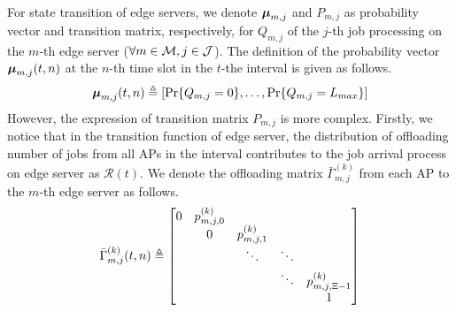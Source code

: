 {    %
    For state transition of edge servers, we denote $\boldsymbol{\mu}_{m,j}$ and $P_{m,j}$ as probability vector and transition matrix, respectively, for $Q_{m,j}$ of the $j$-th job processing on the $m$-th edge server ($\forall m\in\mathcal{M}, j\in\mathcal{J}$). The definition of the probability vector $\boldsymbol{\mu}_{m,j}(t,n)$ at the $n$-th time slot in the $t$-the interval is given as follows.
    \begin{align}
        \boldsymbol{\mu}_{m,j}(t,n) \triangleq [\Pr\{Q_{m,j}=0\}, \dots, \Pr\{Q_{m,j}=L_{max}\}]
    \end{align}
    However, the expression of transition matrix $P_{m,j}$ is more complex. Firstly, we notice that in the transition function of edge server, the distribution of offloading number of jobs from all APs in the interval contributes to the job arrival process on edge server as $\mathcal{R}(t)$. We denote the offloading matrix $\bar{\Gamma}^{(k)}_{m,j}$ from each AP to the $m$-th edge server as follows.
    \begin{align}
        \bar{\Gamma}^{(k)}_{m,j}(t,n) \triangleq
        \begin{bmatrix}
            0 & p^{(k)}_{m,j,0} &                 &        &                     \\
            & 0               & p^{(k)}_{m,j,1} &        &                     \\
            &                 & \ddots          & \ddots &                     \\
            &                 &                 & \ddots & p^{(k)}_{m,j,\Xi-1} \\
            &                 &                 &        & 1                   \\

\end{bmatrix}
\end{align}}
